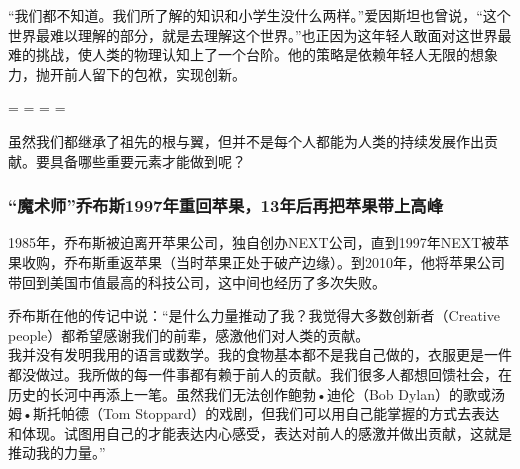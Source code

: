 “我们都不知道。我们所了解的知识和小学生没什么两样。”爱因斯坦也曾说，“这个世界最难以理解的部分，就是去理解这个世界。”也正因为这年轻人敢面对这世界最难的挑战，使人类的物理认知上了一个台阶。他的策略是依赖年轻人无限的想象力，抛开前人留下的包袱，实现创新。


\begin{description}
\tightlist
\item[]
= = = =
\end{description}

虽然我们都继承了祖先的根与翼，但并不是每个人都能为人类的持续发展作出贡献。要具备哪些重要元素才能做到呢？ 


\hypertarget{ux9b54ux672fux5e08ux4e54ux5e03ux65af1997ux5e74ux91cdux56deux82f9ux679c13ux5e74ux540eux518dux628aux82f9ux679cux5e26ux4e0aux9ad8ux5cf0}{%
\subsubsection{“魔术师”乔布斯1997年重回苹果，13年后再把苹果带上高峰}\label{ux9b54ux672fux5e08ux4e54ux5e03ux65af1997ux5e74ux91cdux56deux82f9ux679c13ux5e74ux540eux518dux628aux82f9ux679cux5e26ux4e0aux9ad8ux5cf0}}

1985年，乔布斯被迫离开苹果公司，独自创办NEXT公司，直到1997年NEXT被苹果收购，乔布斯重返苹果（当时苹果正处于破产边缘）。到2010年，他将苹果公司带回到美国市值最高的科技公司，这中间也经历了多次失败。

乔布斯在他的传记中说：“是什么力量推动了我？我觉得大多数创新者（Creative people）都希望感谢我们的前辈，感激他们对人类的贡献。\\

我并没有发明我用的语言或数学。我的食物基本都不是我自己做的，衣服更是一件都没做过。我所做的每一件事都有赖于前人的贡献。我们很多人都想回馈社会，在历史的长河中再添上一笔。虽然我们无法创作鲍勃•迪伦（Bob Dylan）的歌或汤姆•斯托帕德（Tom Stoppard）的戏剧，但我们可以用自己能掌握的方式去表达和体现。试图用自己的才能表达内心感受，表达对前人的感激并做出贡献，这就是推动我的力量。” 


